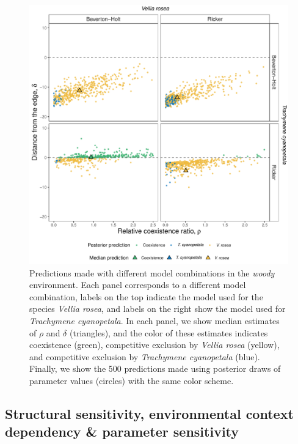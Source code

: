 \begin{refsection}
\begin{figure}[H]
  \centerline{\includegraphics[width=1\textwidth]{figures/chapter3_fig4}}
  \caption[Predictions made with different model combinations in the \textit{woody} environment]{Predictions made with different model combinations in the \textit{woody} environment. Each panel corresponds to a different model combination, labels on the top indicate the model used for the species \textit{Vellia rosea}, and labels on the right show  the model used for \textit{Trachymene cyanopetala}.  In each panel, we show median estimates of $\rho$ and $\delta$ (triangles), and the color of these estimates indicates coexistence (green), competitive exclusion by \textit{Vellia rosea} (yellow), and competitive exclusion by \textit{Trachymene cyanopetala} (blue). Finally, we show the 500 predictions made using posterior draws of parameter values (circles) with the same color scheme.}
    \label{fig:woody}
\end{figure}

\subsection*{ Structural sensitivity, environmental context dependency \& parameter sensitivity }


\end{refsection}
